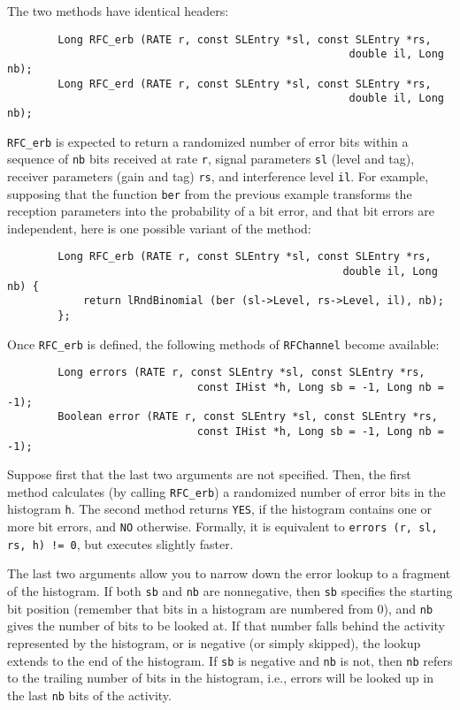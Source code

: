 The two methods have identical headers:
\begin{verbatim}
        Long RFC_erb (RATE r, const SLEntry *sl, const SLEntry *rs,
                                                      double il, Long nb);
        Long RFC_erd (RATE r, const SLEntry *sl, const SLEntry *rs,
                                                      double il, Long nb);
\end{verbatim}
\noindent
{\tt RFC\_erb}
is expected to return a randomized number of error bits within a
sequence of {\tt nb} bits received at rate {\tt r},
signal parameters {\tt sl} (level and tag),
receiver parameters (gain and tag) {\tt rs}, and interference level {\tt il}.
For example, supposing that the function {\tt ber} from the previous example
transforms the reception parameters into the probability of a
bit error, and that bit errors are independent, here is one possible
variant of the method:

\begin{verbatim}
        Long RFC_erb (RATE r, const SLEntry *sl, const SLEntry *rs,
                                                     double il, Long nb) {
            return lRndBinomial (ber (sl->Level, rs->Level, il), nb);
        };
\end{verbatim}
\noindent
Once {\tt RFC\_erb} is defined, the following methods of {\tt RFChannel} become
available:

\begin{verbatim}
        Long errors (RATE r, const SLEntry *sl, const SLEntry *rs,
                              const IHist *h, Long sb = -1, Long nb = -1);
        Boolean error (RATE r, const SLEntry *sl, const SLEntry *rs,
                              const IHist *h, Long sb = -1, Long nb = -1);
\end{verbatim}
\noindent
Suppose first that the last two arguments are not specified.
Then, the first method calculates (by calling {\tt RFC\_erb})
a randomized number of error bits in the histogram {\tt h}.
The second method returns {\tt YES}, if the histogram contains one or more
bit errors, and {\tt NO} otherwise.
Formally, it is equivalent to {\tt errors (r, sl, rs, h) != 0}, but
executes slightly faster.

The last two arguments allow you to narrow down the error lookup to a
fragment of the histogram.
If both {\tt sb} and {\tt nb} are nonnegative, then {\tt sb} specifies
the starting bit position (remember that bits in a histogram
are numbered from 0), and {\tt nb} gives the number of bits to be looked at.
If that number falls behind the activity represented by the histogram, or
is negative (or simply skipped), the lookup extends to the end of the
histogram.
If {\tt sb} is negative and {\tt nb} is not, then {\tt nb} refers to the
trailing number of bits in the histogram, i.e., errors will be looked up in
the last {\tt nb} bits of the activity.

